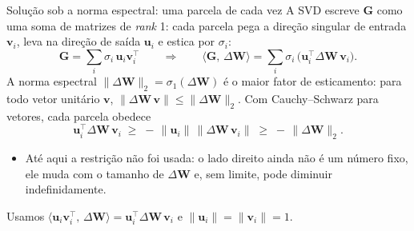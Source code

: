 \documentclass[aspectratio=169,xcolor=dvipsnames]{beamer}
\begin{document}
  \begin{frame}{Solução sob a norma espectral: uma parcela de cada vez}
    A SVD escreve $\mathbf{G}$ como uma soma de matrizes de \textit{rank} 1: cada parcela pega a
    direção singular de entrada $\mathbf{v}_{i}$, leva na direção de saída $\mathbf{u}_{i}$ e estica por $\sigma_{i}$:
    \[
      \mathbf{G}=\sum_{i}\sigma_{i}\,\mathbf{u}_{i}\mathbf{v}_{i}^{\top}
      \qquad\Longrightarrow\qquad
      \langle \mathbf{G},\,\Delta \mathbf{W}\rangle=\sum_{i}\sigma_{i}\,\big(\mathbf{u}_{i}^{\top}\Delta \mathbf{W}\,\mathbf{v}_{i}\big).
    \]
    A norma espectral $\|\Delta \mathbf{W}\|_{2}=\sigma_{1}(\Delta \mathbf{W})$ é o maior fator de esticamento:
    para todo vetor unitário $\mathbf{v}$, $\|\Delta \mathbf{W}\,\mathbf{v}\|\le\|\Delta \mathbf{W}\|_{2}$.
    Com Cauchy--Schwarz para vetores, cada parcela obedece
    \[
      \mathbf{u}_{i}^{\top}\Delta \mathbf{W}\,\mathbf{v}_{i}
      \;\ge\;-\,\|\mathbf{u}_{i}\|\,\|\Delta \mathbf{W}\,\mathbf{v}_{i}\|
      \;\ge\;-\,\|\Delta \mathbf{W}\|_{2}.
    \]
    \begin{itemize}
      \item Até aqui a restrição não foi usada: o lado direito ainda não é um número fixo, ele
        muda com o tamanho de $\Delta \mathbf{W}$ e, sem limite, pode diminuir indefinidamente.
    \end{itemize}
    \vfill
    {\footnotesize\color{gray!50!black}Usamos $\langle \mathbf{u}_{i}\mathbf{v}_{i}^{\top},\,\Delta \mathbf{W}\rangle
    =\mathbf{u}_{i}^{\top}\Delta \mathbf{W}\,\mathbf{v}_{i}$ e $\|\mathbf{u}_{i}\|=\|\mathbf{v}_{i}\|=1$.}
  \end{frame}
\end{document}
